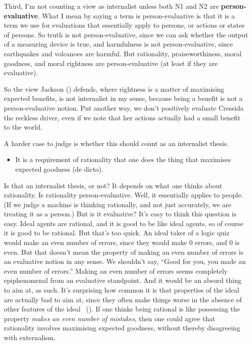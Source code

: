 \documentclass[
  10pt,
  letterpaper,
  twoside]{scrbook}
\providecommand{\tightlist}{%
  \setlength{\itemsep}{0pt}\setlength{\parskip}{0pt}}\usepackage{longtable,booktabs,array}
\begin{document}
Third, I'm not counting a view as internalist unless both N1 and N2 are
\textbf{person-evaluative}. What I mean by saying a term is
person-evaluative is that it is a term we use for evaluations that
essentially apply to persons, or actions or states of persons. So truth
is not person-evaluative, since we can ask whether the output of a
measuring device is true, and harmfulness is not person-evaluative,
since earthquakes and volcanoes are harmful. But rationality,
praiseworthiness, moral goodness, and moral rightness are
person-evaluative (at least if they are evaluative).

So the view Jackson () defends, where
rightness is a matter of maximising expected benefits, is not
internalist in my sense, because being a benefit is not a
person-evaluative notion. Put another way, we don't positively evaluate
{Cressida} the reckless driver, even if we note that her actions
actually had a small benefit to the world.

A harder case to judge is whether this should count as an internalist
thesis.

\begin{itemize}
\tightlist
\item
  It is a requirement of rationality that one does the thing that
  maximises expected goodness (de dicto).
\end{itemize}

Is that an internalist thesis, or not? It depends on what one thinks
about rationality. Is rationality person-evaluative. Well, it
essentially applies to people. (If we judge a machine is thinking
rationally, and not just accurately, we are treating it as a person.)
But is it evaluative? It's easy to think this question is easy. Ideal
agents are rational, and it is good to be like ideal agents, so of
course it is good to be rational. But that's too quick. An ideal taker
of a logic quiz would make an even number of errors, since they would
make 0 errors, and 0 is even. But that doesn't mean the property of
making an even number of errors is an evaluative notion in any sense. We
shouldn't say, ``Good for you, you made an even number of errors.''
Making an even number of errors seems completely epiphenomenal from an
evaluative standpoint. And it would be an absurd thing to aim at, as
such. It's surprising how common it is that properties of the ideal are
actually bad to aim at, since they often make things worse in the
absence of other features of the ideal
~(). If
one thinks being rational is like possessing the property \emph{makes an
even number of mistakes}, then one could agree that rationality involves
maximising expected goodness, without thereby disagreeing with
externalism.
\end{document}
